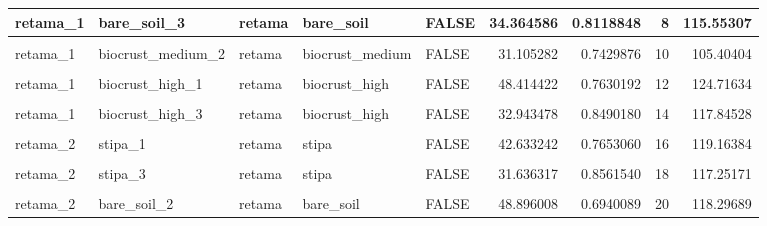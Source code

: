 \documentclass[]{article}
\begin{document}
\begin{table}[H]
{\begin{tabular}[t]{l|l|l|l|l|r|r|r|r}
\hline
retama\_1 & bare\_soil\_3 & retama & bare\_soil & FALSE & 34.364586 & 0.8118848 & 8 & 115.55307\\
\hline
\cellcolor{gray!6}{retama\_1} & \cellcolor{gray!6}{biocrust\_medium\_1} & \cellcolor{gray!6}{retama} & \cellcolor{gray!6}{biocrust\_medium} & \cellcolor{gray!6}{FALSE} & \cellcolor{gray!6}{44.099499} & \cellcolor{gray!6}{0.8808309} & \cellcolor{gray!6}{9} & \cellcolor{gray!6}{132.18258}\\
\hline
retama\_1 & biocrust\_medium\_2 & retama & biocrust\_medium & FALSE & 31.105282 & 0.7429876 & 10 & 105.40404\\
\hline
\cellcolor{gray!6}{retama\_1} & \cellcolor{gray!6}{biocrust\_medium\_3} & \cellcolor{gray!6}{retama} & \cellcolor{gray!6}{biocrust\_medium} & \cellcolor{gray!6}{FALSE} & \cellcolor{gray!6}{5.892976} & \cellcolor{gray!6}{0.8384753} & \cellcolor{gray!6}{11} & \cellcolor{gray!6}{89.74050}\\
\hline
retama\_1 & biocrust\_high\_1 & retama & biocrust\_high & FALSE & 48.414422 & 0.7630192 & 12 & 124.71634\\
\hline
\cellcolor{gray!6}{retama\_1} & \cellcolor{gray!6}{biocrust\_high\_2} & \cellcolor{gray!6}{retama} & \cellcolor{gray!6}{biocrust\_high} & \cellcolor{gray!6}{FALSE} & \cellcolor{gray!6}{38.305420} & \cellcolor{gray!6}{0.7500951} & \cellcolor{gray!6}{13} & \cellcolor{gray!6}{113.31493}\\
\hline
retama\_1 & biocrust\_high\_3 & retama & biocrust\_high & FALSE & 32.943478 & 0.8490180 & 14 & 117.84528\\
\hline
\cellcolor{gray!6}{retama\_2} & \cellcolor{gray!6}{retama\_3} & \cellcolor{gray!6}{retama} & \cellcolor{gray!6}{retama} & \cellcolor{gray!6}{TRUE} & \cellcolor{gray!6}{32.057704} & \cellcolor{gray!6}{0.8394976} & \cellcolor{gray!6}{15} & \cellcolor{gray!6}{216.00746}\\
\hline
retama\_2 & stipa\_1 & retama & stipa & FALSE & 42.633242 & 0.7653060 & 16 & 119.16384\\
\hline
\cellcolor{gray!6}{retama\_2} & \cellcolor{gray!6}{stipa\_2} & \cellcolor{gray!6}{retama} & \cellcolor{gray!6}{stipa} & \cellcolor{gray!6}{FALSE} & \cellcolor{gray!6}{37.522843} & \cellcolor{gray!6}{0.5339814} & \cellcolor{gray!6}{17} & \cellcolor{gray!6}{90.92099}\\
\hline
retama\_2 & stipa\_3 & retama & stipa & FALSE & 31.636317 & 0.8561540 & 18 & 117.25171\\
\hline
\cellcolor{gray!6}{retama\_2} & \cellcolor{gray!6}{bare\_soil\_1} & \cellcolor{gray!6}{retama} & \cellcolor{gray!6}{bare\_soil} & \cellcolor{gray!6}{FALSE} & \cellcolor{gray!6}{43.684561} & \cellcolor{gray!6}{0.7455036} & \cellcolor{gray!6}{19} & \cellcolor{gray!6}{118.23492}\\
\hline
retama\_2 & bare\_soil\_2 & retama & bare\_soil & FALSE & 48.896008 & 0.6940089 & 20 & 118.29689\\
\hline
\end{tabular}}
\end{table}
\end{document}
